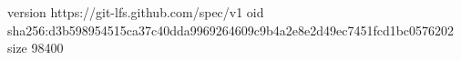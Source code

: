 version https://git-lfs.github.com/spec/v1
oid sha256:d3b598954515ca37c40dda9969264609c9b4a2e8e2d49ec7451fcd1bc0576202
size 98400
